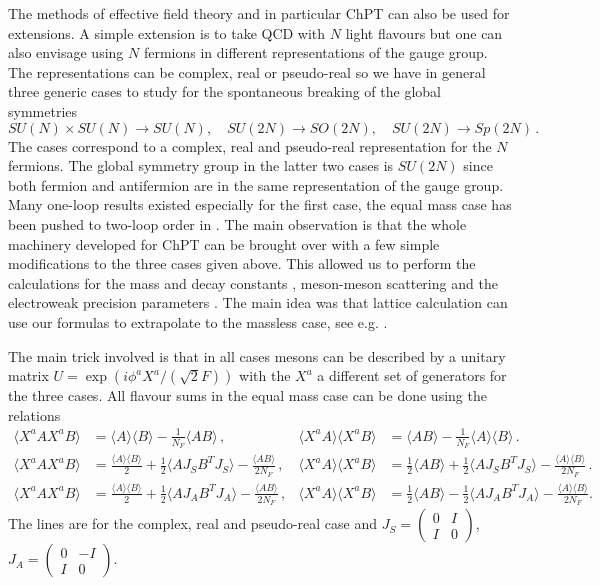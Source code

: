 \documentclass[cits,hyper]{PoS}
\begin{document}
The methods of effective field theory and in particular ChPT can also be
used for extensions. A simple extension is to take QCD with $N$ light
flavours but one can also envisage using $N$ fermions in different
representations of the gauge group. The representations can be complex, real or
pseudo-real so we have in general three generic cases to study for
the spontaneous breaking of the global symmetries \cite{Peskin,Preskill}
\begin{equation}
SU(N)\times SU(N)\to SU(N),\quad
SU(2N)\to SO(2N),\quad
SU(2N)\to Sp(2N)\,.
\end{equation}
The cases correspond to a complex, real and pseudo-real representation for
the $N$ fermions. The global symmetry group in the latter two cases
is $SU(2N)$ since both fermion and antifermion are in the same representation
of the gauge group.
Many one-loop results existed especially for the first case,
the equal mass case has been pushed to two-loop order in
\cite{BL1,BL2,BL3}. The main observation \cite{BL1} is that the whole
machinery developed for ChPT can be brought over with a few simple
modifications to the three cases given above. This allowed us to perform
the calculations for the mass and decay constants \cite{BL1},
meson-meson scattering \cite{BL2} and the electroweak precision
parameters \cite{BL3}. The main idea was that lattice calculation can use
our formulas to extrapolate to the massless case, see e.g. \cite{Buchoff}.

The main trick involved is that in all cases mesons can be described by a
unitary matrix $U=\exp(i\phi^a X^a/(\sqrt{2}F))$ with the $X^a$
a different set of generators for the three cases. All flavour sums in
the equal mass case can be done using the relations
\newcommand{\trfa}[1]{\langle #1\rangle}
\begin{align}
\trfa{X^a A X^a B}&= \trfa{A}\trfa{B}
 -\frac{1}{N_F}\trfa{AB}\,,&
\trfa{ X^a A}\trfa{X^a B}&=
 \trfa{AB}
 -\frac{1}{N_F}\trfa{A}\trfa{B}\,.
\nonumber\\
\trfa{X^a A X^a B}&= \frac{\trfa{A}\trfa{B}}{2}
 +\frac{1}{2}\trfa{AJ_S B^T J_S}-\frac{\trfa{AB}}{2N_F}\,,&
\trfa{ X^a A}\trfa{X^a B}&=
 \frac{1}{2}\trfa{AB}+\frac{1}{2}\trfa{AJ_S B^T J_S}
 -\frac{\trfa{A}\trfa{B}}{2N_F}\,.
\nonumber\\
\trfa{X^a A X^a B}&= \frac{\trfa{A}\trfa{B}}{2}
+\frac{1}{2}\trfa{AJ_A B^T J_A} -\frac{\trfa{AB}}{2N_F}\,,&
\trfa{ X^a A}\trfa{X^a B}&=
 \frac{1}{2}\trfa{AB}-\frac{1}{2}\trfa{AJ_A B^T J_A}
 -\frac{\trfa{A}\trfa{B}}{2N_F}.
\end{align}
The lines are for the complex, real and pseudo-real case and
$J_S=
\left(\begin{array}{cc} 0 & I\\
I & 0\end{array}\right)$, $J_A=
\left(\begin{array}{cc} 0 & -I\\
I & 0\end{array}\right)$.
\end{document}
